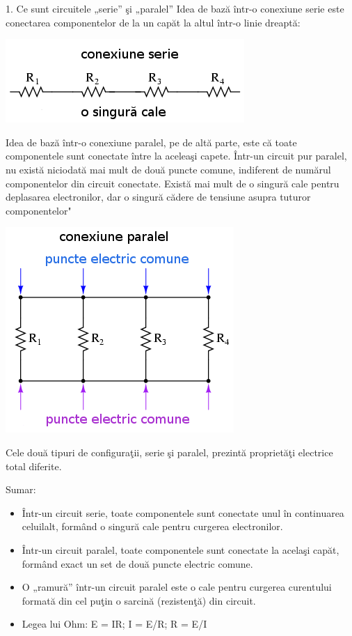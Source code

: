 \documentclass[presentation]{beamer}
\begin{document}
\begin{frame}[label=sec-1]{1. Ce sunt circuitele „serie” şi „paralel”}
Idea de bază într-o conexiune serie este conectarea componentelor de la
un capăt la altul într-o linie dreaptă:

\includegraphics[width=.9\linewidth]{../poze/00085.png}

Idea de bază într-o conexiune paralel, pe de altă parte, este că toate
componentele sunt conectate între la aceleaşi capete. Într-un circuit
pur paralel, nu există niciodată mai mult de două puncte comune,
indiferent de numărul componentelor din circuit conectate. Există mai
mult de o singură cale pentru deplasarea electronilor, dar o singură
cădere de tensiune asupra tuturor componentelor"

\includegraphics[width=.9\linewidth]{../poze/00086.png}

Cele două tipuri de configuraţii, serie şi paralel, prezintă proprietăţi
electrice total diferite.

Sumar:

\begin{itemize}
\item Într-un circuit serie, toate componentele sunt conectate unul în
continuarea celuilalt, formând o singură cale pentru curgerea
electronilor.
\item Într-un circuit paralel, toate componentele sunt conectate la acelaşi
capăt, formând exact un set de două puncte electric comune.
\item O „ramură” într-un circuit paralel este o cale pentru curgerea
curentului formată din cel puţin o sarcină (rezistenţă) din circuit.
\item Legea lui Ohm: E = IR; I = E/R; R = E/I
\end{itemize}
\end{frame}
\end{document}
